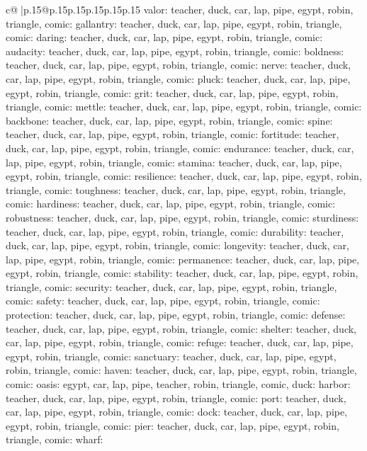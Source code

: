 \documentclass{article}
\begin{document}
{\begin{supertabular}{c@{$\;$}|p{.15\linewidth}@{}p{.15\linewidth}p{.15\linewidth}p{.15\linewidth}p{.15\linewidth}p{.15\linewidth}}
{{{valor\nTARGETS: teacher, duck, car, lap, pipe, egypt, robin, triangle, comic\n\nCLUE: gallantry\nTARGETS: teacher, duck, car, lap, pipe, egypt, robin, triangle, comic\n\nCLUE: daring\nTARGETS: teacher, duck, car, lap, pipe, egypt, robin, triangle, comic\n\nCLUE: audacity\nTARGETS: teacher, duck, car, lap, pipe, egypt, robin, triangle, comic\n\nCLUE: boldness\nTARGETS: teacher, duck, car, lap, pipe, egypt, robin, triangle, comic\n\nCLUE: nerve\nTARGETS: teacher, duck, car, lap, pipe, egypt, robin, triangle, comic\n\nCLUE: pluck\nTARGETS: teacher, duck, car, lap, pipe, egypt, robin, triangle, comic\n\nCLUE: grit\nTARGETS: teacher, duck, car, lap, pipe, egypt, robin, triangle, comic\n\nCLUE: mettle\nTARGETS: teacher, duck, car, lap, pipe, egypt, robin, triangle, comic\n\nCLUE: backbone\nTARGETS: teacher, duck, car, lap, pipe, egypt, robin, triangle, comic\n\nCLUE: spine\nTARGETS: teacher, duck, car, lap, pipe, egypt, robin, triangle, comic\n\nCLUE: fortitude\nTARGETS: teacher, duck, car, lap, pipe, egypt, robin, triangle, comic\n\nCLUE: endurance\nTARGETS: teacher, duck, car, lap, pipe, egypt, robin, triangle, comic\n\nCLUE: stamina\nTARGETS: teacher, duck, car, lap, pipe, egypt, robin, triangle, comic\n\nCLUE: resilience\nTARGETS: teacher, duck, car, lap, pipe, egypt, robin, triangle, comic\n\nCLUE: toughness\nTARGETS: teacher, duck, car, lap, pipe, egypt, robin, triangle, comic\n\nCLUE: hardiness\nTARGETS: teacher, duck, car, lap, pipe, egypt, robin, triangle, comic\n\nCLUE: robustness\nTARGETS: teacher, duck, car, lap, pipe, egypt, robin, triangle, comic\n\nCLUE: sturdiness\nTARGETS: teacher, duck, car, lap, pipe, egypt, robin, triangle, comic\n\nCLUE: durability\nTARGETS: teacher, duck, car, lap, pipe, egypt, robin, triangle, comic\n\nCLUE: longevity\nTARGETS: teacher, duck, car, lap, pipe, egypt, robin, triangle, comic\n\nCLUE: permanence\nTARGETS: teacher, duck, car, lap, pipe, egypt, robin, triangle, comic\n\nCLUE: stability\nTARGETS: teacher, duck, car, lap, pipe, egypt, robin, triangle, comic\n\nCLUE: security\nTARGETS: teacher, duck, car, lap, pipe, egypt, robin, triangle, comic\n\nCLUE: safety\nTARGETS: teacher, duck, car, lap, pipe, egypt, robin, triangle, comic\n\nCLUE: protection\nTARGETS: teacher, duck, car, lap, pipe, egypt, robin, triangle, comic\n\nCLUE: defense\nTARGETS: teacher, duck, car, lap, pipe, egypt, robin, triangle, comic\n\nCLUE: shelter\nTARGETS: teacher, duck, car, lap, pipe, egypt, robin, triangle, comic\n\nCLUE: refuge\nTARGETS: teacher, duck, car, lap, pipe, egypt, robin, triangle, comic\n\nCLUE: sanctuary\nTARGETS: teacher, duck, car, lap, pipe, egypt, robin, triangle, comic\n\nCLUE: haven\nTARGETS: teacher, duck, car, lap, pipe, egypt, robin, triangle, comic\n\nCLUE: oasis\nTARGETS: egypt, car, lap, pipe, teacher, robin, triangle, comic, duck\n\nCLUE: harbor\nTARGETS: teacher, duck, car, lap, pipe, egypt, robin, triangle, comic\n\nCLUE: port\nTARGETS: teacher, duck, car, lap, pipe, egypt, robin, triangle, comic\n\nCLUE: dock\nTARGETS: teacher, duck, car, lap, pipe, egypt, robin, triangle, comic\n\nCLUE: pier\nTARGETS: teacher, duck, car, lap, pipe, egypt, robin, triangle, comic\n\nCLUE: wharf\nTARGETS: }}}
\end{supertabular}}
\end{document}
